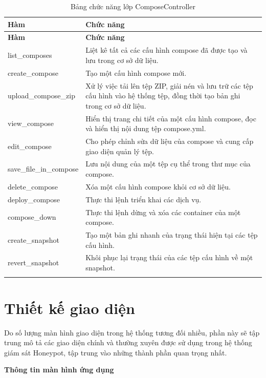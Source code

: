 \documentclass[../DoAn.tex]{subfiles}
\begin{document}
\begin{longtable}{|p{5cm}|p{9cm}|}
\hline
\textbf{Hàm} & \textbf{Chức năng} \\
\hline
\endfirsthead
\hline
\textbf{Hàm} & \textbf{Chức năng} \\
\hline
\endhead

list\_composes & Liệt kê tất cả các cấu hình compose đã được tạo và lưu trong cơ sở dữ liệu. \\
\hline
create\_compose & Tạo một cấu hình compose mới. \\
\hline
upload\_compose\_zip & Xử lý việc tải lên tệp ZIP, giải nén và lưu trữ các tệp cấu hình vào hệ thống tệp, đồng thời tạo bản ghi trong cơ sở dữ liệu. \\
\hline
view\_compose & Hiển thị trang chi tiết của một cấu hình compose, đọc và hiển thị nội dung tệp compose.yml. \\
\hline
edit\_compose & Cho phép chỉnh sửa dữ liệu của compose và cung cấp giao diện quản lý tệp. \\
\hline
save\_file\_in\_compose & Lưu nội dung của một tệp cụ thể trong thư mục của compose. \\
\hline
delete\_compose & Xóa một cấu hình compose khỏi cơ sở dữ liệu. \\
\hline
deploy\_compose & Thực thi lệnh triển khai các dịch vụ. \\
\hline
compose\_down & Thực thi lệnh dừng và xóa các container của một compose. \\
\hline
create\_snapshot & Tạo một bản ghi nhanh của trạng thái hiện tại các tệp cấu hình. \\
\hline
revert\_snapshot & Khôi phục lại trạng thái của các tệp cấu hình về một snapshot. \\
\hline

\caption{Bảng chức năng lớp ComposeController}
\label{table:compose-controller}
\end{longtable}


\section{Thiết kế giao diện}

Do số lượng màn hình giao diện trong hệ thống tương đối nhiều, phần này sẽ tập trung mô tả các giao diện chính và thường xuyên được sử dụng trong hệ thống giám sát Honeypot, tập trung vào những thành phần quan trọng nhất.

\textbf{Thông tin màn hình ứng dụng}
\end{document}
